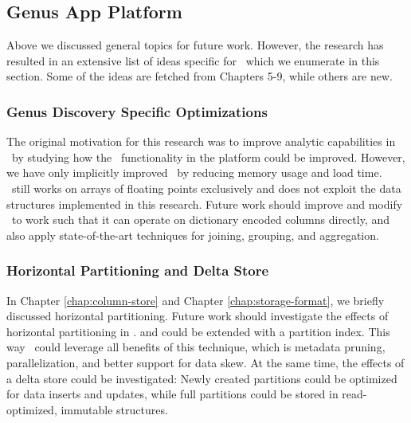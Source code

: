 \subsection{Genus App Platform}
\label{sub:Genus App Platform}
Above we discussed general topics for future work. However, the research has resulted in an extensive list of ideas specific for \gap~which we enumerate in this section. Some of the ideas are fetched from Chapters 5-9, while others are new.

\subsubsection{Genus Discovery Specific Optimizations}
\label{ssub:Genus Discovery Specific Optimizations}
The original motivation for this research was to improve analytic capabilities in \gap~by studying how the \bd~functionality in the platform could be improved. However, we have only implicitly improved \gd~by reducing memory usage and load time. \gd~still works on arrays of floating points exclusively and does not exploit the data structures implemented in this research. Future work should improve and modify \gd~to work such that it can operate on dictionary encoded columns directly, and also apply state-of-the-art techniques for joining, grouping, and aggregation.

\subsubsection{Horizontal Partitioning and Delta Store}
\label{ssub:Horizontal Partitioning and Delta Store}
In Chapter \ref{chap:column-store} and Chapter \ref{chap:storage-format}, we briefly discussed horizontal partitioning. Future work should investigate the effects of horizontal partitioning in \gap.  and  could be extended with a partition index. This way \gap~could leverage all benefits of this technique, which is metadata pruning, parallelization, and better support for data skew. At the same time, the effects of a delta store could be investigated: Newly created partitions could be optimized for data inserts and updates, while full partitions could be stored in read-optimized, immutable structures.

